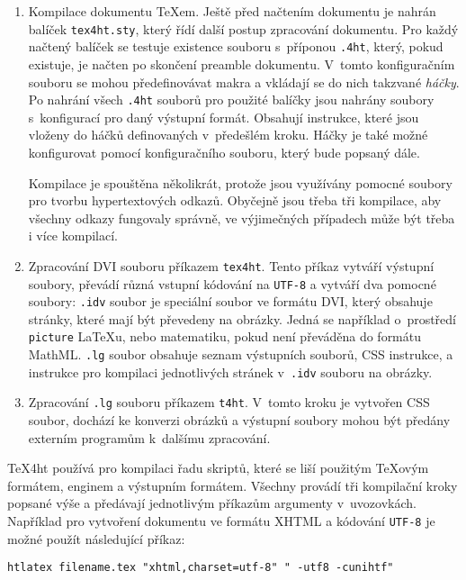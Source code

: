 \documentclass{csbulletin}
\begin{document}
\begin{enumerate}
  \item Kompilace dokumentu \TeX em. Ještě před načtením dokumentu je nahrán
    balíček \texttt{tex4ht.sty}, který řídí další postup zpracování dokumentu.
    Pro každý načtený balíček se testuje existence souboru s~příponou
    \texttt{.4ht}, který, pokud existuje, je načten po skončení preamble
    dokumentu. V~tomto konfiguračním souboru se mohou předefinovávat makra a
    vkládají se do nich takzvané \textit{háčky}. Po nahrání všech \texttt{.4ht}
    souborů pro použité balíčky jsou nahrány soubory s~konfigurací pro daný
    výstupní formát. Obsahují instrukce, které jsou vloženy do háčků
    definovaných v~předešlém kroku. Háčky je také možné konfigurovat pomocí
    konfiguračního souboru, který bude popsaný dále. 

    Kompilace je spouštěna několikrát, protože jsou využívány pomocné soubory
    pro tvorbu hypertextových odkazů. Obyčejně jsou třeba tři kompilace, aby
    všechny odkazy fungovaly správně, ve výjimečných případech může být třeba i
    více kompilací. 

  \item Zpracování DVI souboru příkazem \texttt{tex4ht}. Tento příkaz vytváří
    výstupní soubory, převádí různá vstupní kódování na \texttt{UTF-8} a
    vytváří dva pomocné soubory: \texttt{.idv} soubor je speciální soubor ve
    formátu DVI, který obsahuje stránky, které mají být převedeny na obrázky.
    Jedná se například o~prostředí \texttt{picture} LaTeXu, nebo matematiku,
    pokud není převáděna do formátu MathML. \texttt{.lg} soubor obsahuje seznam
    výstupních souborů, CSS instrukce, a instrukce pro kompilaci jednotlivých
    stránek v~\texttt{.idv} souboru na obrázky.
  \item Zpracování \texttt{.lg} souboru příkazem \texttt{t4ht}. V~tomto kroku
    je vytvořen CSS soubor, dochází ke konverzi obrázků a výstupní soubory
    mohou být předány externím programům k~dalšímu zpracování.
\end{enumerate} 

\TeX{}4ht používá pro kompilaci řadu skriptů, které se liší použitým \TeX ovým
formátem, enginem a výstupním formátem. Všechny provádí tři kompilační kroky
popsané výše a předávají jednotlivým příkazům argumenty v~uvozovkách.
Například pro vytvoření dokumentu ve formátu XHTML a kódování \texttt{UTF-8} je
možné použít následující příkaz: 
  
\begin{verbatim}
htlatex filename.tex "xhtml,charset=utf-8" " -utf8 -cunihtf"
\end{verbatim}
\end{document}

